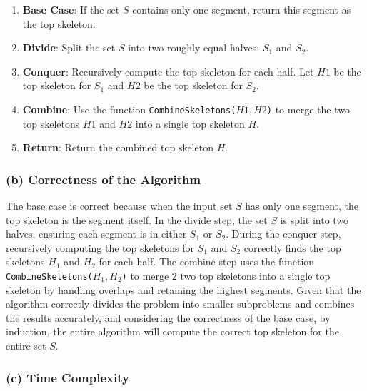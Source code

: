 \documentclass[12pt]{article}
\begin{document}
        \begin{enumerate}
            \item \textbf{Base Case}:
            If the set \( S \) contains only one segment, return this segment as the top skeleton.
           
            \item \textbf{Divide}:
            Split the set \( S \) into two roughly equal halves: \( S_1 \) and \( S_2 \).
           
            \item \textbf{Conquer}:
            Recursively compute the top skeleton for each half. Let \( H1 \) be the top skeleton for \( S_1 \) and \( H2 \) be the top skeleton for \( S_2 \).
           
            \item \textbf{Combine}:
            Use the function \texttt{CombineSkeletons(\( H1, H2 \))} to merge the two top skeletons \( H1 \) and \( H2 \) into a single top skeleton \( H \).
           
            \item \textbf{Return}:
            Return the combined top skeleton \( H \).
        \end{enumerate}


        \subsubsection*{(b) Correctness of the Algorithm}

        The base case is correct because when the input set \( S \) has only one segment, the top skeleton is the segment itself. In the divide step, the set \( S \) is split into two halves, ensuring each segment is in either \( S_1 \) or \( S_2 \). During the conquer step, recursively computing the top skeletons for \( S_1 \) and \( S_2 \) correctly finds the top skeletons \( H_1 \) and \( H_2 \) for each half. The combine step uses the function \texttt{CombineSkeletons(\( H_1, H_2 \))} to merge 2 two top skeletons into a single top skeleton by handling overlaps and retaining the highest segments. Given that the algorithm correctly divides the problem into smaller subproblems and combines the results accurately, and considering the correctness of the base case, by induction, the entire algorithm will compute the correct top skeleton for the entire set \( S \).

        \subsubsection*{(c) Time Complexity}
\end{document}
